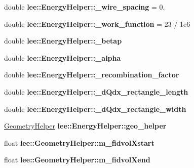 \begin{DoxyCompactItemize}
\item 
\hypertarget{group__lee_ga412905c2b45aa8103823f84f7bd7ea2a}{double {\bfseries lee\-::\-Energy\-Helper\-::\-\_\-wire\-\_\-spacing} = 0.}\label{group__lee_ga412905c2b45aa8103823f84f7bd7ea2a}

\item 
\hypertarget{group__lee_gafed9eac818bc9ab7f0c0cd3c808feeea}{double {\bfseries lee\-::\-Energy\-Helper\-::\-\_\-work\-\_\-function} = 23 / 1e6}\label{group__lee_gafed9eac818bc9ab7f0c0cd3c808feeea}

\item 
\hypertarget{group__lee_ga6fa094a0561f3185ae9be3cd668a64fb}{double {\bfseries lee\-::\-Energy\-Helper\-::\-\_\-betap}}\label{group__lee_ga6fa094a0561f3185ae9be3cd668a64fb}

\item 
\hypertarget{group__lee_gac748df10e62e8969fd39c85a6c4e1e95}{double {\bfseries lee\-::\-Energy\-Helper\-::\-\_\-alpha}}\label{group__lee_gac748df10e62e8969fd39c85a6c4e1e95}

\item 
\hypertarget{group__lee_gafbe2338334b0bb800473d29350d866d1}{double {\bfseries lee\-::\-Energy\-Helper\-::\-\_\-recombination\-\_\-factor}}\label{group__lee_gafbe2338334b0bb800473d29350d866d1}

\item 
\hypertarget{group__lee_gaffce1a06abee9651a41c454aa5f9032f}{double {\bfseries lee\-::\-Energy\-Helper\-::\-\_\-d\-Qdx\-\_\-rectangle\-\_\-length}}\label{group__lee_gaffce1a06abee9651a41c454aa5f9032f}

\item 
\hypertarget{group__lee_ga227149dafb056c355057c753ac768b13}{double {\bfseries lee\-::\-Energy\-Helper\-::\-\_\-d\-Qdx\-\_\-rectangle\-\_\-width}}\label{group__lee_ga227149dafb056c355057c753ac768b13}

\item 
\hypertarget{group__lee_ga613fe58326a28695ad83ddd7bdf8ff57}{\hyperlink{classGeometryHelper}{Geometry\-Helper} {\bfseries lee\-::\-Energy\-Helper\-::geo\-\_\-helper}}\label{group__lee_ga613fe58326a28695ad83ddd7bdf8ff57}

\item 
\hypertarget{group__lee_gaf555c24c00c66fa78b480b72633678b3}{float {\bfseries lee\-::\-Geometry\-Helper\-::m\-\_\-fidvol\-Xstart}}\label{group__lee_gaf555c24c00c66fa78b480b72633678b3}

\item 
\hypertarget{group__lee_ga65a7d75c7b48384cf068e8336c6b8d55}{float {\bfseries lee\-::\-Geometry\-Helper\-::m\-\_\-fidvol\-Xend}}\label{group__lee_ga65a7d75c7b48384cf068e8336c6b8d55}


\end{DoxyCompactItemize}
